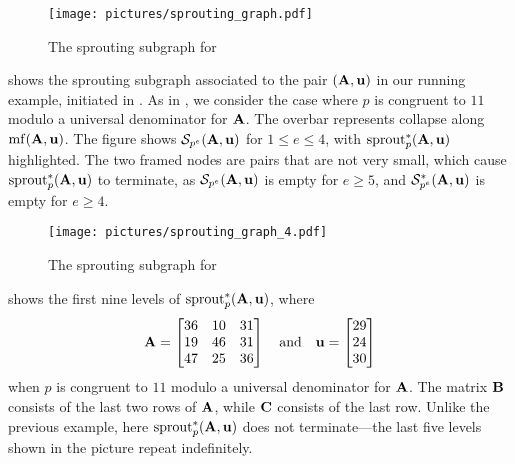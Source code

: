 \documentclass{amsart}
\begin{document}
\begin{example}
   \label{ex: ft.4}
   \begin{figure}
      \centering
      \texttt{[image: pictures/sprouting\_graph.pdf]}
      \caption{The sprouting subgraph for }
      \label{fig: sprouting graph}
   \end{figure}
    shows the sprouting subgraph associated to the pair $(\mathbf{A},\mathbf{u})$ in our running example, initiated in .
   As in , we consider the case where $p$ is congruent to $11$ modulo a universal denominator for $\mathbf{A}$.
   The overbar represents collapse along $\operatorname{mf}(\mathbf{A},\mathbf{u})$.
   The figure shows $\mathcal{S}_{p^e}(\mathbf{A},\mathbf{u})$ for $1 \le e \le 4$, with $\operatorname{sprout}^*_p(\mathbf{A},\mathbf{u})$ highlighted.
   The two framed nodes are pairs that are not very small, which cause $\operatorname{sprout}^*_p(\mathbf{A},\mathbf{u})$ to terminate, as $\mathcal{S}_{p^e}(\mathbf{A},\mathbf{u})$ is empty for $e\ge 5$, and $\mathcal{S}_{p^e}^*(\mathbf{A},\mathbf{u})$ is empty for $e\ge 4$.
\end{example}

\begin{example}
   \label{ex: new example}
   \begin{figure}
      \centering
      \texttt{[image: pictures/sprouting\_graph\_4.pdf]}
      \caption{The sprouting subgraph for }
      \label{fig: sprouting graph 2}
   \end{figure}
    shows the first nine levels of $\operatorname{sprout}^*_p(\mathbf{A},\mathbf{u})$, where
   \[
      \mathbf{A} = \begin{bmatrix} 36&10&31 \\ 19&46&31 \\ 47&25&36 \end{bmatrix}
      \quad\text{and} \quad
      \mathbf{u} =\begin{bmatrix} 29 \\ 24 \\ 30 \end{bmatrix}
   \]
   when $p$ is congruent to $11$ modulo a universal denominator for $\mathbf{A}$.
   The matrix $\mathbf{B}$ consists of the last two rows of $\mathbf{A}$, while $\mathbf{C}$ consists of the last row.
   Unlike the previous example, here $\operatorname{sprout}^*_p(\mathbf{A},\mathbf{u})$ does not terminate---the last five levels shown in the picture repeat indefinitely.
\end{example}
\end{document}
